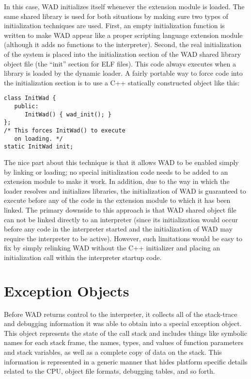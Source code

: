 In this case, WAD initializes itself whenever the extension module is
loaded.  The same shared library is used for both situations by making
sure two types of initialization techniques are used.  First, an empty
initialization function is written to make WAD appear like a proper
scripting language extension module (although it adds no functions to
the interpreter).  Second, the real initialization of the system is
placed into the initialization section of the WAD shared library
object file (the ``init'' section for ELF files).  This code always executes
when a library is loaded by the dynamic loader.  A fairly portable way
to force code into the initialization section is to use a C++
statically constructed object like this:

\begin{verbatim}
class InitWad {
   public:
      InitWad() { wad_init(); }
};
/* This forces InitWad() to execute
   on loading. */
static InitWad init;
\end{verbatim}

The nice part about this technique is that it allows WAD to be enabled
simply by linking or loading; no special initialization code needs to
be added to an extension module to make it work.  In addition, due to
the way in which the loader resolves and initializes libraries, the
initialization of WAD is guaranteed to execute before any of the code
in the extension module to which it has been linked.  The primary
downside to this approach is that WAD shared object file can not be
linked directly to an interpreter (since its initialization would
occur before any code in the interpreter started and the
initialization of WAD may require the interpreter to be active).
However, such limitations would be easy to fix by simply relinking
WAD without the C++ initializer and placing an initialization call
within the interpreter startup code.

\section{Exception Objects}

Before WAD returns control to the interpreter, it collects all of the
stack-trace and debugging information it was able to obtain into a
special exception object. This object represents the state of the call
stack and includes things like symbolic names for each stack frame,
the names, types, and values of function parameters and stack
variables, as well as a complete copy of data on the stack. This
information is represented in a generic manner that hides
platform specific details related to the CPU, object file formats,
debugging tables, and so forth.

